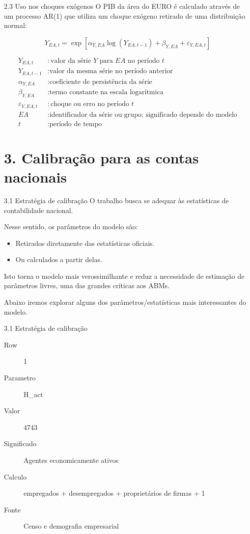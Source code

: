 \documentclass[aspectratio=169,11pt]{beamer}
\begin{document}
\begin{frame}[allowframebreaks]{2.3 Uso nos choques exógenos}
\normalsize
O PIB da área do EURO é calculado através de um processo AR(1) que utiliza um choque exógeno retirado de uma distribuição normal:

\[
Y_{EA,t}=
\exp\left[
\alpha_{Y,EA}\log(Y_{EA,t-1})
+\beta_{Y,EA}
+\varepsilon_{Y,EA,t}
\right]
\]

\[
\begin{aligned}
Y_{EA,t} &: \text{valor da série }Y\text{ para }EA\text{ no período }t\\
Y_{EA,t-1} &: \text{valor da mesma série no período anterior}\\
\alpha_{Y,EA} &: \text{coeficiente de persistência da série}\\
\beta_{Y,EA} &: \text{termo constante na escala logarítmica}\\
\varepsilon_{Y,EA,t} &: \text{choque ou erro no período }t\\
EA &: \text{identificador da série ou grupo; significado depende do modelo}\\
t &: \text{período de tempo}
\end{aligned}
\]
\end{frame}


\section{3. Calibração para as contas nacionais}

\begin{frame}[allowframebreaks]{3.1 Estratégia de calibração}
\normalsize
O trabalho busca se adequar às estatísticas de contabilidade nacional.

Nesse sentido, os parâmetros do modelo são:

\begin{itemize}
\item
  Retirados diretamente das estatísticas oficiais.
\item
  Ou calculados a partir delas.
\end{itemize}

Isto torna o modelo mais verossimilhante e reduz a necessidade de estimação de parâmetros livres, uma das grandes críticas aos ABMs.

Abaixo iremos explorar alguns dos parâmetros/estatísticas mais interessantes do modelo.
\end{frame}


\begin{frame}[allowframebreaks]{3.1 Estratégia de calibração}
\small
\begin{description}
\item[Row] 1
\item[Parametro] H\_act
\item[Valor] 4743
\item[Significado] Agentes economicamente ativos
\item[Calculo] empregados + desempregados + proprietários de firmas + 1
\item[Fonte] Censo e demografia empresarial
\end{description}
\end{frame}
\end{document}
